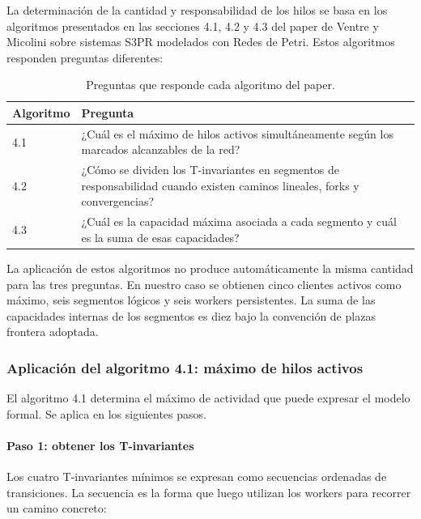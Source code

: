 \documentclass[11pt,a4paper]{article}
\begin{document}
La determinación de la cantidad y responsabilidad de los hilos se basa en los
algoritmos presentados en las secciones 4.1, 4.2 y 4.3 del paper de Ventre y
Micolini sobre sistemas S3PR modelados con Redes de Petri. Estos algoritmos
responden preguntas diferentes:

\begin{table}[H]
    \centering
    \caption{Preguntas que responde cada algoritmo del paper.}
    \label{tab:algoritmos-responsabilidad}
    \begin{tabularx}{\textwidth}{@{} l X @{}}
        \toprule
        \textbf{Algoritmo} & \textbf{Pregunta} \\ \midrule
        4.1 & ¿Cuál es el máximo de hilos activos simultáneamente según los
        marcados alcanzables de la red? \\
        4.2 & ¿Cómo se dividen los T-invariantes en segmentos de responsabilidad
        cuando existen caminos lineales, forks y convergencias? \\
        4.3 & ¿Cuál es la capacidad máxima asociada a cada segmento y cuál es la
        suma de esas capacidades? \\
        \bottomrule
    \end{tabularx}
\end{table}

La aplicación de estos algoritmos no produce automáticamente la misma
cantidad para las tres preguntas. En nuestro caso se obtienen cinco clientes
activos como máximo, seis segmentos lógicos y seis workers persistentes. La
suma de las capacidades internas de los segmentos es diez bajo la convención
de plazas frontera adoptada.

\subsubsection{Aplicación del algoritmo 4.1: máximo de hilos activos}

El algoritmo 4.1 determina el máximo de actividad que puede expresar el modelo
formal. Se aplica en los siguientes pasos.

\paragraph{Paso 1: obtener los T-invariantes}

Los cuatro T-invariantes mínimos se expresan como secuencias ordenadas de
transiciones. La secuencia es la forma que luego utilizan los workers para
recorrer un camino concreto:
\end{document}
